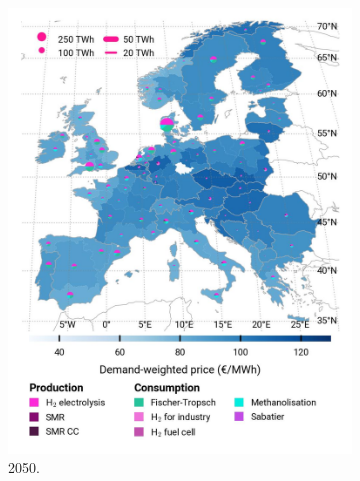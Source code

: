 \documentclass[preprint,12pt,sort&compress]{elsarticle}
\begin{document}
\begin{figure}[htbp]
\begin{subfigure}[t]{0.33\textwidth}
    \includegraphics[width=1\textwidth]{maps/no-pipelines-no-pcipmi/base_s_adm___2050-balance_map_H2}
    \caption{ 2050.}
    \label{fig:DI_lt_2050_h2}
  \end{subfigure}
  \begin{subfigure}[t]{0.33\textwidth}
      \vspace{0pt}

\end{subfigure}
\end{figure}
\end{document}
